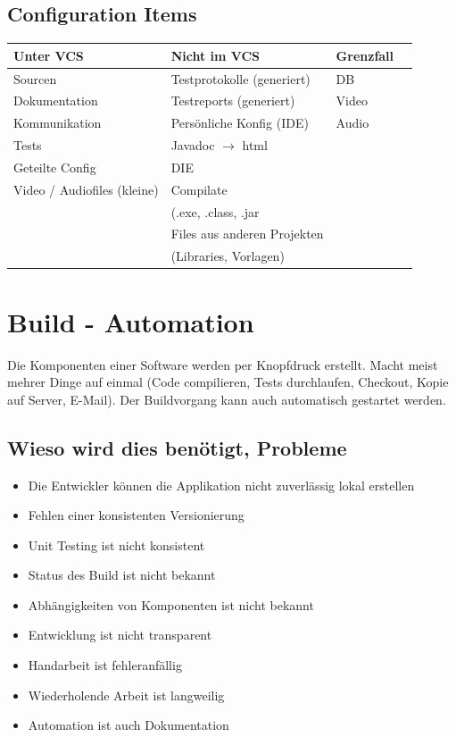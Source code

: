 \documentclass[10pt]{article}
\begin{document}
\subsection{Configuration Items}
\begin{center}
\begin{tabular}{|lll|c} 
\hline
Unter VCS & Nicht im VCS & Grenzfall \\
\hline
Sourcen & Testprotokolle (generiert) & DB \\
Dokumentation & Testreports (generiert) & Video \\ 
Kommunikation & Persönliche Konfig (IDE) & Audio \\
Tests & Javadoc $\rightarrow$ html &  \\
Geteilte Config & DIE & \\
Video / Audiofiles (kleine) & Compilate &\\
& (.exe, .class, .jar & \\
 & Files aus anderen Projekten & \\ 
 & (Libraries, Vorlagen) & \\

\hline
\end{tabular}
\end{center}

\section{Build - Automation}
Die Komponenten einer Software werden per Knopfdruck erstellt. Macht meist mehrer Dinge auf einmal (Code compilieren, Tests durchlaufen, Checkout, Kopie auf Server, E-Mail). Der Buildvorgang kann auch automatisch gestartet werden.
\subsection{Wieso wird dies benötigt, Probleme}
\begin{itemize}
	\item Die Entwickler können die Applikation nicht zuverlässig lokal erstellen
	\item Fehlen einer konsistenten Versionierung
	\item Unit Testing ist nicht konsistent
	\item Status des Build ist nicht bekannt
	\item Abhängigkeiten von Komponenten ist nicht bekannt
	\item Entwicklung ist nicht transparent
	\item Handarbeit ist fehleranfällig
	\item Wiederholende Arbeit ist langweilig
	\item Automation ist auch Dokumentation
\end{itemize}
\end{document}
